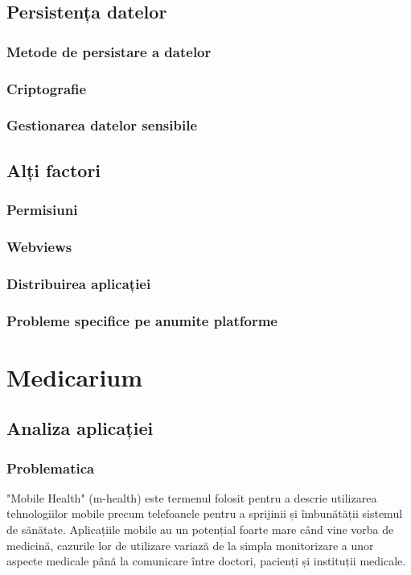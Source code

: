 \documentclass[12pt]{article}
\begin{document}
\subsection{Persistența datelor}
\subsubsection{Metode de persistare a datelor}
\subsubsection{Criptografie}
\subsubsection{Gestionarea datelor sensibile}

\subsection{Alți factori}
\subsubsection{Permisiuni}
\subsubsection{Webviews}
\subsubsection{Distribuirea aplicației}
\subsubsection{Probleme specifice pe anumite platforme}

\newpage
\section{Medicarium}
\subsection{Analiza aplicației}
\subsubsection{Problematica}


"Mobile Health" (m-health) \cite{kahn2010mobile}
este termenul folosit pentru a descrie utilizarea tehnologiilor mobile precum telefoanele pentru
a sprijinii și îmbunătății sistemul de sănătate. Aplicațiile mobile au un potențial foarte mare când vine vorba de medicină, cazurile lor
de utilizare variază de la simpla monitorizare a unor aspecte medicale până la 
comunicare între doctori, pacienți și instituții medicale.
\end{document}
